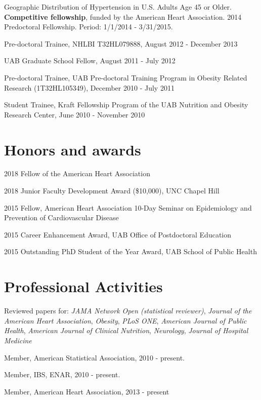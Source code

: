 \documentclass[10pt,letterpaper]{article}
\renewenvironment{itemize}{
  \begin{list}{}{
    \setlength{\leftmargin}{1.5em}
    \setlength{\itemsep}{0.25em}
    \setlength{\parskip}{0pt}
    \setlength{\parsep}{0.25em}
  }
}{
  \end{list}
}
\begin{document}
\begin{itemize}
	\item Geographic Distribution of Hypertension in U.S. Adults Age 45 or Older. \textbf{Competitive fellowship}, funded by the American Heart Association. 2014 Predoctoral Fellowship. Period: 1/1/2014 - 3/31/2015.\\
	
	\item Pre-doctoral Trainee, NHLBI T32HL079888, August 2012 - December 2013\\
	
	\item UAB Graduate School Fellow, August 2011 - July 2012\\
	
	\item Pre-doctoral Trainee, UAB Pre-doctoral Training Program in Obesity Related Research (1T32HL105349), December 2010 - July 2011\\
	
	\item Student Trainee, Kraft Fellowship Program of the UAB Nutrition and Obesity Research Center, June 2010 - November 2010
\end{itemize}

\section*{Honors and awards}
\begin{itemize}
    \item 2018 Fellow of the American Heart Association
    \item 2018 Junior Faculty Development Award (\$10,000), UNC Chapel Hill
    \item 2015 Fellow, American Heart Association 10-Day Seminar on Epidemiology and Prevention of Cardiovascular Disease
	\item 2015 Career Enhancement Award, UAB Office of Postdoctoral Education 
	\item 2015 Outstanding PhD Student of the Year Award, UAB School of Public Health
\end{itemize}

\section*{Professional Activities}

\begin{itemize}
\item Reviewed papers for: \emph{JAMA Network Open (statistical reviewer)}, \emph{Journal of the American Heart Association}, \emph{Obesity}, \emph{PLoS ONE}, \emph{American Journal of Public Health}, \emph{American Journal of Clinical Nutrition}, \emph{Neurology}, \emph{Journal of Hospital Medicine}
\item Member, American Statistical Association, 2010 - present.
\item Member, IBS, ENAR, 2010 - present.
\item Member, American Heart Association, 2013 - present
\end{itemize}
\end{document}
